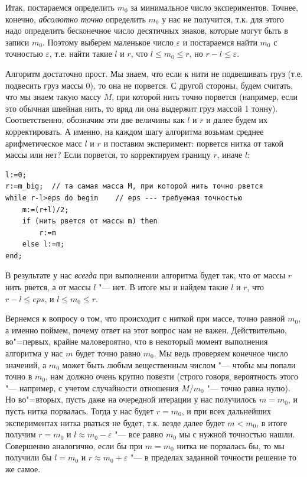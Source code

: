 \documentclass[a4paper,10pt]{problems}
\let\eps\varepsilon
\begin{document}
Итак, постараемся определить $m_0$ за минимальное число экспериментов. 
Точнее, конечно, \textit{абсолютно точно} определить $m_0$ у нас не получится, т.к. для этого надо определить бесконечное число десятичных знаков, 
которые могут быть в записи $m_0$. 
Поэтому выберем маленькое число $\eps$ и постараемся найти $m_0$ с точностью $\eps$, 
т.е. найти такие $l$ и $r$, что $l\leq m_0\leq r$, но $r-l\leq \eps$.

Алгоритм достаточно прост. Мы знаем, что если к нити не подвешивать груз (т.е. подвесить груз массы $0$), то она не порвется. 
С другой стороны, будем считать, что мы знаем такую массу $M$, при которой нить точно порвется 
(например, если это обычная швейная нить, то вряд ли она выдержит груз массой 1 тонну).
Соответственно, обозначим эти две величины как $l$ и $r$ и далее будем их корректировать. 
А именно, на каждом шагу алгоритма возьмам среднее арифметическое масс $l$ и $r$ и поставим эксперимент: порвется нитка от такой массы или нет? 
Если порвется, то корректируем границу $r$, иначе $l$:
\begin{codesampleo}\begin{verbatim}
l:=0;
r:=m_big;  // та самая масса M, при которой нить точно рвется
while r-l>eps do begin    // eps --- требуемая точностью
    m:=(r+l)/2;
    if (нить рвется от массы m) then
        r:=m
    else l:=m;
end;
\end{verbatim}
\end{codesampleo}

В результате у нас \textit{всегда} при выполнении алгоритма будет так, что от массы $r$ нить рвется, а от массы $l$ "--- нет. 
В итоге мы и найдем такие $l$ и $r$, что $r-l\leq eps$, и $l\leq m_0\leq r$.

Вернемся к вопросу о том, что происходит с ниткой при массе, точно равной $m_0$, а именно поймем, почему ответ на этот вопрос нам не важен.
Действительно, во"=первых, крайне маловероятно, что в некоторый момент выполнения алгоритма у нас $m$ будет точно равно $m_0$.
Мы ведь проверяем конечное число значений, а $m_0$ может быть любым вещественным числом "--- чтобы мы попали точно в $m_0$,
нам должно очень крупно повезти (строго говоря, вероятность этого "--- например, с учетом случайности отношения $M/m_0$ "--- точно равна нулю).
Но во"=вторых, пусть даже на очередной итерации у нас получилось $m=m_0$, и пусть нитка порвалась. 
Тогда у нас будет $r=m_0$, и при всех дальнейших экспериментах нитка рваться не будет, т.к. везде далее будет $m<m_0$,
в итоге получим $r=m_0$ и $l\approx m_0-\eps$ "--- все равно $m_0$ мы с нужной точностью нашли. 
Совершенно аналогично, если бы при $m=m_0$ нитка не порвалась бы, то мы получили бы $l=m_0$ и $r\approx m_0+\eps$ 
"--- в пределах заданной точности решение то же самое.
\end{document}

